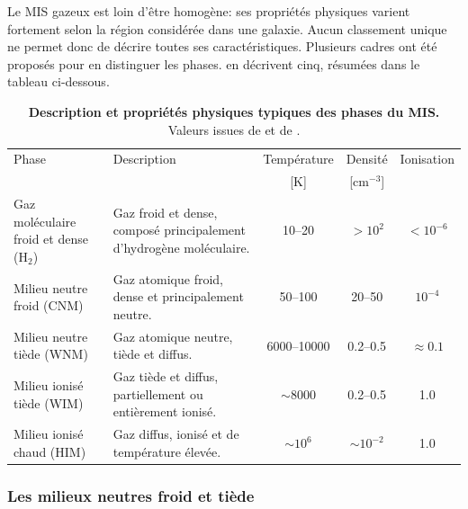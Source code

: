 Le MIS gazeux est loin d'être homogène: ses propriétés physiques varient fortement selon la région considérée dans une galaxie. Aucun classement unique ne permet donc de décrire toutes ses caractéristiques. Plusieurs cadres ont été proposés pour en distinguer les phases. \citet{Klessen2016} en décrivent cinq, résumées dans le tableau ci-dessous.

\begin{table}[htbp]
\centering
\caption{\textbf{Description et propriétés physiques typiques des phases du MIS.} Valeurs issues de \citet{Klessen2016} et de \citet{Ferriere_2001}.}
\label{tab:ISMcomponents}
\small
\setlength{\tabcolsep}{6pt}
\renewcommand{\arraystretch}{1.15}
\begin{tabularx}{\linewidth}{L{3.2cm} L{6.3cm} c c c}
\toprule
Phase & Description & Température & Densité & Ionisation \\
 & & [K] & [cm$^{-3}$] & \\
\midrule
Gaz moléculaire froid et dense (H$_2$) & Gaz froid et dense, composé principalement d'hydrogène moléculaire. & 10--20 & $>10^{2}$ & $<10^{-6}$ \\
Milieu neutre froid (CNM) & Gaz atomique froid, dense et principalement neutre. & 50--100 & 20--50 & $10^{-4}$ \\
Milieu neutre tiède (WNM) & Gaz atomique neutre, tiède et diffus. & 6000--10000 & 0.2--0.5 & $\approx 0.1$ \\
Milieu ionisé tiède (WIM) & Gaz tiède et diffus, partiellement ou entièrement ionisé. & $\sim 8000$ & 0.2--0.5 & 1.0 \\
Milieu ionisé chaud (HIM) & Gaz diffus, ionisé et de température élevée. & $\sim 10^{6}$ & $\sim 10^{-2}$ & 1.0 \\
\bottomrule
\end{tabularx}
\end{table}

\subsubsection{Les milieux neutres froid et tiède}


